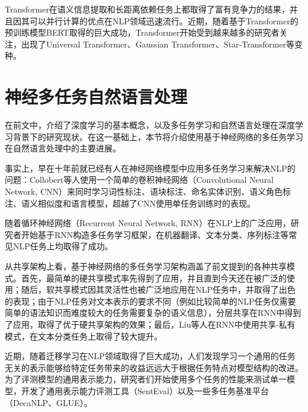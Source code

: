 
Transformer在语义信息提取和长距离依赖任务上都取得了富有竞争力的结果\cite{DBLP:conf/emnlp/TangMRS18}，并且因其可以并行计算的优点在NLP领域迅速流行。近期，随着基于Transformer的预训练模型BERT\cite{devlin2018bert}取得的巨大成功，Transformer开始受到越来越多的研究者关注，出现了Universal Transformer\cite{dehghani2018universal}、Gaussian Transformer\cite{guo2019gaussian}、Star-Transformer\cite{guo2019star}等变种。


\section{神经多任务自然语言处理}
\label{sec:mtl4nlp}
在前文中，介绍了深度学习的基本概念，以及多任务学习和自然语言处理在深度学习背景下的研究现状。在这一基础上，本节将介绍使用基于神经网络的多任务学习在自然语言处理中的主要进展。

事实上，早在十年前就已经有人在神经网络模型中应用多任务学习来解决NLP的问题：Collobert等人\cite{DBLP:conf/icml/CollobertW08}使用一个简单的卷积神经网络（Convolutional Neural Network, CNN）来同时学习词性标注、语块标注、命名实体识别、语义角色标注、语义相似度和语言模型，超越了CNN使用单任务训练时的表现。

随着循环神经网络（Recurrent Neural Network, RNN）在NLP上的广泛应用，研究者开始基于RNN构造多任务学习框架，在机器翻译\cite{DBLP:conf/acl/DongWHYW15}、文本分类\cite{DBLP:conf/ijcai/LiuQH16}\cite{DBLP:conf/acl/LiuQH17}、序列标注\cite{DBLP:conf/acl/SogaardG16}等常见NLP任务上均取得了成功。

从共享架构上看，基于神经网络的多任务学习架构涵盖了前文提到的各种共享模式。首先，最简单的硬共享模式率先得到了应用\cite{DBLP:conf/icml/CollobertW08}，并且直到今天还在被广泛的使用\cite{liu2019multi}；随后，软共享模式因其灵活性也被广泛地应用在NLP任务中，并取得了出色的表现\cite{1705.08142}；由于NLP任务对文本表示的要求不同（例如比较简单的NLP任务仅需要简单的语法知识而难度较大的任务需要复杂的语义信息），分层共享在RNN中得到了应用\cite{DBLP:conf/acl/SogaardG16}，取得了优于硬共享架构的效果；最后，Liu等人\cite{DBLP:conf/ijcai/LiuQH16}在RNN中使用共享-私有模式，在文本分类任务上取得了较大提升。

近期，随着迁移学习在NLP领域取得了巨大成功\cite{DBLP:conf/naacl/PetersNIGCLZ18}\cite{radford2018improving}\cite{devlin2018bert}，人们发现学习一个通用的任务无关的表示能够给特定任务带来的收益远远大于根据任务特点对模型结构的改进。为了评测模型的通用表示能力，研究者们开始使用多个任务的性能来测试单一模型，开发了通用表示能力评测工具（SentEval\cite{DBLP:conf/lrec/ConneauK18}）以及一些多任务基准平台（DecaNLP\cite{mccann2018natural}、GLUE\cite{DBLP:conf/emnlp/WangSMHLB18}）。

